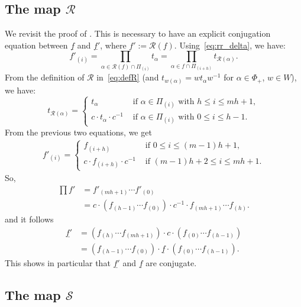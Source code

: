 \documentclass[11pt]{article}
\theoremstyle{definition}
\newcommand{\RR}{\mathcal{R}}
\renewcommand{\SS}{\mathcal{S}}
\begin{document}
\subsection{\texorpdfstring{The map $\RR$}{The map R}}
\label{sec:invaR}

We revisit the proof of \cite[Proposition~11.1]{douvropoulosjosuatverges1}. This is necessary to have an explicit conjugation equation between $\underline{f}$ and $\underline{f'}$, where $ f' := \RR(f) $. 
Using~\eqref{eq:rr_delta}, we have:
\[
    f'_{(i)} = \prod_{ \alpha \in \RR(f) \cap \varPi_{(i)}} t_\alpha = \prod_{ \alpha \in f \cap \varPi_{(i+h)}} t_{\RR(\alpha)}.
\]
From the definition of $\RR$ in~\eqref{eq:defR} (and $t_{w(\alpha)} = w t_\alpha w^{-1}$ for $\alpha\in\Phi_+$, $w\in W$), we have:
\[
    t_{\RR(\alpha)}
    =
    \begin{cases}
        t_\alpha & \text{ if } \alpha\in \varPi_{(i)} \text{ with } h \leq i \leq mh+1, \\
        c \cdot t_\alpha \cdot c^{-1} & \text{ if } \alpha\in \varPi_{(i)} \text{ with } 0 \leq i \leq h-1.
    \end{cases}
\]
From the previous two equations, we get
\begin{align}
    \label{eq:f'RR}
    f'_{(i)} = 
    \begin{cases}
        f_{(i+h)} & \text{ if } 0 \leq i \leq (m-1)h+1,\\
        c\cdot f_{(i+h)} \cdot c^{-1} & \text{ if } (m-1)h+2 \leq i \leq mh+1.
    \end{cases} 
\end{align}
So, 
\begin{align}
    \textstyle\prod f'  &= f'_{(mh+1)} \cdots f'_{(0)} \\
                    &=  c\cdot (f_{(h-1)}\cdots f_{(0)} ) \cdot c^{-1} \cdot f_{(mh+1)} \cdots f_{(h)}.
\end{align}
and it follows
\begin{align}
    \underline{f'}  
    &= 
    (f_{(h)} \cdots f_{(mh+1)}) \cdot c \cdot (f_{(0)} \cdots f_{(h-1)}) \\
    &=  
    (f_{(h-1)}\cdots f_{(0)}) \cdot \underline{f} \cdot (f_{(0)}\cdots f_{(h-1)}).
\end{align}
This shows in particular that $\underline{f'}$ and $\underline{f}$ are conjugate.

\subsection{\texorpdfstring{The map $\SS$}{The map S}}
\label{sec:invaS}
\end{document}
